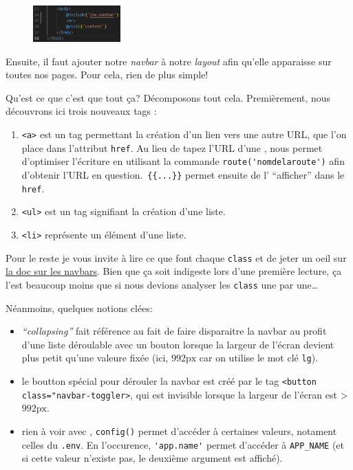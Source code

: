 \documentclass[internal]{nhitec_design}
\begin{document}
\begin{figure}
    \vspace{-0.5cm}
    \includegraphics[width=0.3\textwidth]{figures-C1/navbar_layout.pdf}
\end{figure}

Ensuite, il faut ajouter notre \textit{navbar} à notre \textit{layout} afin qu'elle apparaisse sur toutes nos pages. Pour cela, rien de plus simple! 
\vspace{2cm}

\newpage

Qu'est ce que c'est que tout ça? Décomposons tout cela.
Premièrement, nous découvrons ici trois nouveaux tags \html{}:
\begin{enumerate}
    \item \verb|<a>| est un tag permettant la création d'un lien vers une autre URL, que l'on place dans l'attribut \verb|href|. Au lieu de tapez l'URL d'une \route{}, \laravel{} nous permet d'optimiser l'écriture en utilisant la commande \verb|route('nomdelaroute')| afin d'obtenir l'URL en question.~\verb|{{...}}| permet ensuite de l' ``afficher'' dans le \verb|href|.
    \item \verb|<ul>| est un tag signifiant la création d'une liste.
    \item \verb|<li>| représente un élément d'une liste.
\end{enumerate}

Pour le reste je vous invite à lire ce que font chaque \verb|class| et de jeter un oeil sur \href{https://getbootstrap.com/docs/5.3/components/navbar/}{la doc \bs{} sur les navbars}. Bien que ça soit indigeste lors d'une première lecture, ça l'est beaucoup moins que si nous devions analyser les \verb|class| une par une\ldots

Néanmoins, quelques notions clées: 
\begin{itemize}
    \item \textit{``collapsing''} fait référence au fait de faire disparaitre la navbar au profit d'une liste déroulable avec un bouton lorsque la largeur de l'écran devient plus petit qu'une valeure fixée (ici, $992\mathrm{px}$ car on utilise le mot clé \verb|lg|).
    \item le boutton spécial pour dérouler la navbar est créé par le tag \verb|<button class="navbar-toggler>|, qui est invisible lorsque la largeur de l'écran est > $992\mathrm{px}$.
    \item rien à voir avec \bs{}, \verb|config()| permet d'accéder à certaines valeurs, notament celles du \verb|.env|. En l'occurence, \verb|'app.name'| permet d'accéder à \verb|APP_NAME| (et si cette valeur n'existe pas, le deuxième argument est affiché).
\end{itemize}
\end{document}
